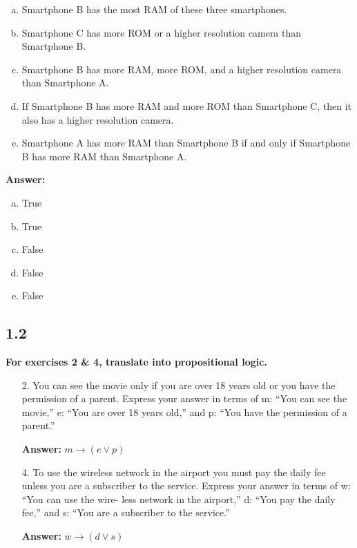 \begin{itemize}
\begin{enumerate}[a.]
\item Smartphone B has the most RAM of these three smartphones.
\item Smartphone C has more ROM or a higher resolution camera than Smartphone B.
\item Smartphone B has more RAM, more ROM, and a higher resolution camera than Smartphone A.
\item If Smartphone B has more RAM and more ROM than Smartphone C, then it also has a higher resolution camera.
\item Smartphone A has more RAM than Smartphone B if and only if Smartphone B has more RAM than Smartphone A.
\end{enumerate}
\textbf{Answer:}
\begin{enumerate}[a.]
    \item True
    \item True
    \item False
    \item False
    \item False
\end{enumerate}
\end{itemize}
\subsection{1.2}
\textbf{For exercises 2 \& 4, translate into propositional logic.}
\begin{itemize}
    \item [2.]You can see the movie only if you are over 18 years old or you have the permission of a parent. Express your answer in terms of m: “You can see the movie,” e: “You are over 18 years old,” and p: “You have the permission of a parent.”

    \textbf{Answer:} $m \rightarrow (e \lor p)$
    \item[4.]To use the wireless network in the airport you must pay the daily fee unless you are a subscriber to the service. Express your answer in terms of w: “You can use the wire-
less network in the airport,” d: “You pay the daily fee,” and s: “You are a subscriber to the service.”

    \textbf{Answer:} $w \rightarrow (d \lor s)$
\end{itemize}

